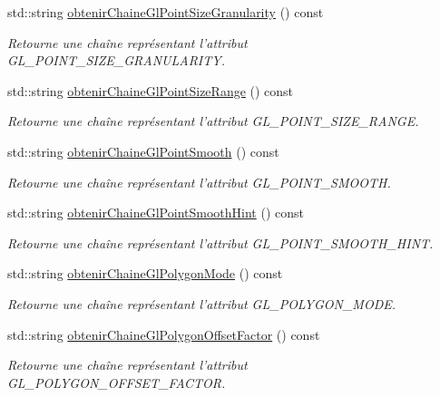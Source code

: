 \begin{DoxyCompactItemize}
std\-::string \hyperlink{group__utilitaire_ga77ea6a1da567197d644dcd11743f67a8}{obtenir\-Chaine\-Gl\-Point\-Size\-Granularity} () const 
\begin{DoxyCompactList}\small\item\em Retourne une chaîne représentant l'attribut G\-L\-\_\-\-P\-O\-I\-N\-T\-\_\-\-S\-I\-Z\-E\-\_\-\-G\-R\-A\-N\-U\-L\-A\-R\-I\-T\-Y. \end{DoxyCompactList}\item 
std\-::string \hyperlink{group__utilitaire_gab2553c47e6d7fa315b61ab5dcdb1506e}{obtenir\-Chaine\-Gl\-Point\-Size\-Range} () const 
\begin{DoxyCompactList}\small\item\em Retourne une chaîne représentant l'attribut G\-L\-\_\-\-P\-O\-I\-N\-T\-\_\-\-S\-I\-Z\-E\-\_\-\-R\-A\-N\-G\-E. \end{DoxyCompactList}\item 
std\-::string \hyperlink{group__utilitaire_ga32e178d5d54d00dc20f27cf516943a65}{obtenir\-Chaine\-Gl\-Point\-Smooth} () const 
\begin{DoxyCompactList}\small\item\em Retourne une chaîne représentant l'attribut G\-L\-\_\-\-P\-O\-I\-N\-T\-\_\-\-S\-M\-O\-O\-T\-H. \end{DoxyCompactList}\item 
std\-::string \hyperlink{group__utilitaire_gaa9c02409795d34b851b6da29f7f91c35}{obtenir\-Chaine\-Gl\-Point\-Smooth\-Hint} () const 
\begin{DoxyCompactList}\small\item\em Retourne une chaîne représentant l'attribut G\-L\-\_\-\-P\-O\-I\-N\-T\-\_\-\-S\-M\-O\-O\-T\-H\-\_\-\-H\-I\-N\-T. \end{DoxyCompactList}\item 
std\-::string \hyperlink{group__utilitaire_ga799784d6a719eb2c25ffd5854ec09aa8}{obtenir\-Chaine\-Gl\-Polygon\-Mode} () const 
\begin{DoxyCompactList}\small\item\em Retourne une chaîne représentant l'attribut G\-L\-\_\-\-P\-O\-L\-Y\-G\-O\-N\-\_\-\-M\-O\-D\-E. \end{DoxyCompactList}\item 
std\-::string \hyperlink{group__utilitaire_gaedc33f5a28be70057bb4b6124b67955a}{obtenir\-Chaine\-Gl\-Polygon\-Offset\-Factor} () const 
\begin{DoxyCompactList}\small\item\em Retourne une chaîne représentant l'attribut G\-L\-\_\-\-P\-O\-L\-Y\-G\-O\-N\-\_\-\-O\-F\-F\-S\-E\-T\-\_\-\-F\-A\-C\-T\-O\-R. \end{DoxyCompactList}\item 

\end{DoxyCompactItemize}
